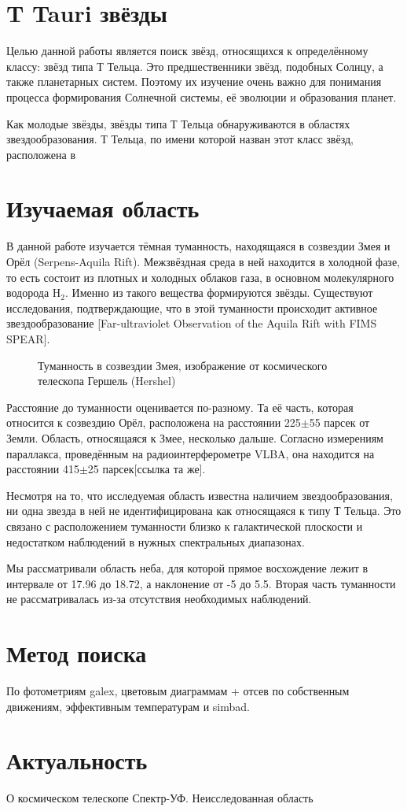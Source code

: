 

\section{T Tauri звёзды}
Целью данной работы является поиск звёзд, относящихся к определённому классу: звёзд типа Т Тельца. 
Это предшественники звёзд, подобных Солнцу, а также планетарных систем. Поэтому их изучение очень важно для понимания процесса формирования Солнечной системы, её эволюции и образования планет. 

Как молодые звёзды, звёзды типа Т Тельца обнаруживаются в областях звездообразования. Т Тельца, по имени которой назван этот класс звёзд, расположена в 

\section{Изучаемая область}

В данной работе изучается тёмная туманность, находящаяся в созвездии Змея и Орёл (Serpens-Aquila Rift). Межзвёздная среда в ней находится в холодной фазе, то есть состоит из плотных и холодных облаков газа, в основном молекулярного водорода H$_{2}$. Именно из такого вещества формируются звёзды. Существуют исследования, подтверждающие, что в этой туманности происходит активное звездообразование [Far-ultraviolet Observation of the Aquila Rift with FIMS SPEAR].

\begin{figure}[ht]
\hfill
\caption{Туманность в созвездии Змея, изображение от космического телескопа Гершель (Hershel)}
\label{fig:area}
\end{figure}


Расстояние до туманности оценивается по-разному. Та её часть, которая относится к созвездию Орёл, расположена на расстоянии 225$\pm$55 парсек от Земли. Область, относящаяся к Змее, несколько дальше. Согласно измерениям параллакса, проведённым на радиоинтерферометре VLBA, она находится на расстоянии 415$\pm$25 парсек[ссылка та же].

Несмотря на то, что исследуемая область известна наличием звездообразования, ни одна звезда в ней не идентифицирована как относящаяся к типу Т Тельца. Это связано с расположением туманности близко к галактической плоскости и недостатком наблюдений в нужных спектральных диапазонах.

Мы рассматривали область неба, для которой прямое восхождение лежит в интервале от 17.96 до 18.72, а наклонение от -5 до 5.5. Вторая часть туманности не рассматривалась из-за отсутствия необходимых наблюдений.

\section{Метод поиска}

По фотометриям galex, цветовым диаграммам + отсев по собственным движениям, эффективным температурам и simbad.

\section{Актуальность}

О космическом телескопе Спектр-УФ. Неисследованная область